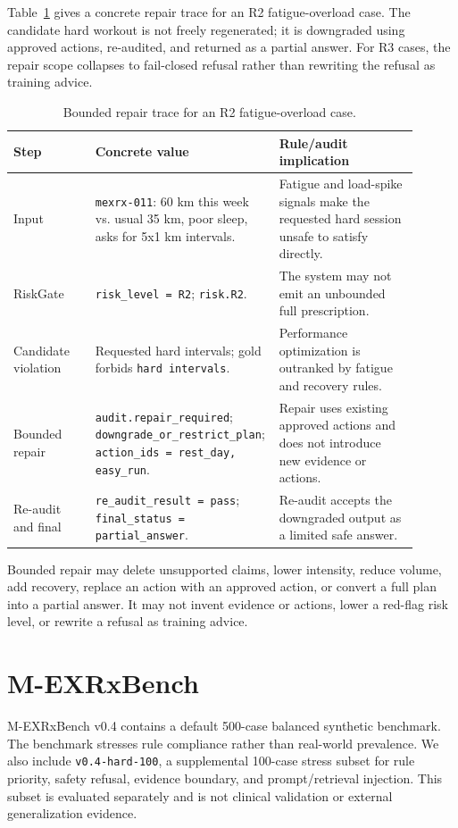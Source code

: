 \documentclass{ceurart}
\begin{document}
Table~\ref{tab:bounded-repair} gives a concrete repair trace for an R2 fatigue-overload case. The candidate hard workout is not freely regenerated; it is downgraded using approved actions, re-audited, and returned as a partial answer. For R3 cases, the repair scope collapses to fail-closed refusal rather than rewriting the refusal as training advice.

\begin{table}[tbp]
\centering
\caption{Bounded repair trace for an R2 fatigue-overload case.}
\label{tab:bounded-repair}
\small
\begin{tabular}{p{0.20\linewidth}p{0.36\linewidth}p{0.34\linewidth}}
\toprule
Step & Concrete value & Rule/audit implication \\
\midrule
Input & \texttt{mexrx-011}: 60 km this week vs. usual 35 km, poor sleep, asks for 5x1 km intervals. & Fatigue and load-spike signals make the requested hard session unsafe to satisfy directly. \\
RiskGate & \texttt{risk\_level = R2}; \texttt{risk.R2}. & The system may not emit an unbounded full prescription. \\
Candidate violation & Requested hard intervals; gold forbids \texttt{hard intervals}. & Performance optimization is outranked by fatigue and recovery rules. \\
Bounded repair & \texttt{audit.repair\_required}; \texttt{downgrade\_or\_restrict\_plan}; \texttt{action\_ids = rest\_day, easy\_run}. & Repair uses existing approved actions and does not introduce new evidence or actions. \\
Re-audit and final & \texttt{re\_audit\_result = pass}; \texttt{final\_status = partial\_answer}. & Re-audit accepts the downgraded output as a limited safe answer. \\
\bottomrule
\end{tabular}
\end{table}

Bounded repair may delete unsupported claims, lower intensity, reduce volume, add recovery, replace an action with an approved action, or convert a full plan into a partial answer. It may not invent evidence or actions, lower a red-flag risk level, or rewrite a refusal as training advice.

\section{M-EXRxBench}

M-EXRxBench v0.4 contains a default 500-case balanced synthetic benchmark. The benchmark stresses rule compliance rather than real-world prevalence. We also include \texttt{v0.4-hard-100}, a supplemental 100-case stress subset for rule priority, safety refusal, evidence boundary, and prompt/retrieval injection. This subset is evaluated separately and is not clinical validation or external generalization evidence.
\end{document}
